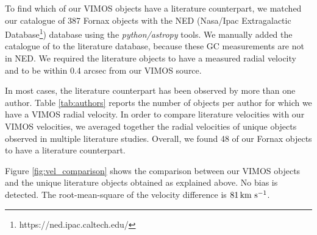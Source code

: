 \documentclass[usenatbib]{mnras}
\newcommand{\kms}{\mbox{\,km~s$^{-1}$}}
\begin{document}
To find which of our VIMOS objects have a literature counterpart, we matched 
our catalogue of 387 Fornax objects with the NED (Nasa/Ipac Extragalactic 
Database\footnote{https://ned.ipac.caltech.edu/}) database using the 
{\it python/astropy} tools. 
We manually added the catalogue of \citet{Schuberth} to the literature 
database, because these GC measurements are not in NED. We required the 
literature objects to have a measured radial velocity and to be within 0.4 
arcsec from our VIMOS source. 

In most cases, the literature counterpart has been observed by more than one 
author. Table \ref{tab:authors} reports the number of objects per author for 
which we have a VIMOS radial velocity. 
In order to compare literature velocities with our VIMOS velocities, we 
averaged together the radial velocities of unique objects observed in multiple 
literature studies. 
Overall, we found 48 of our Fornax objects to have a literature counterpart. 

Figure \ref{fig:vel_comparison} shows the comparison between our VIMOS 
objects and the unique literature objects obtained as explained above. No 
bias is detected. The root-mean-square of the velocity difference is $81 \kms$. 


\end{document}
